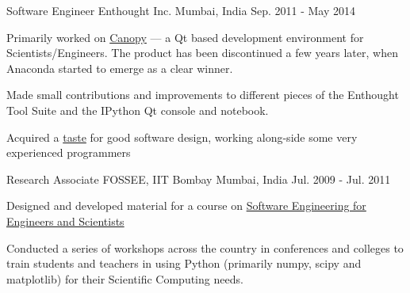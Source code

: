 \begin{cventries}
  \cventry
    {Software Engineer} %
    {Enthought Inc. } %
    {Mumbai, India} %
    {Sep. 2011 - May 2014} %
    {
      \begin{cvitems} %
        \item {Primarily worked on \href{https://web.archive.org/web/20170621202502/https://www.enthought.com/products/canopy/}{Canopy} --- a Qt based development environment for Scientists/Engineers. The product has been discontinued a few years later, when Anaconda started to emerge as a clear winner.}
        \item {Made small contributions and improvements to different pieces of the Enthought Tool Suite and the IPython Qt console and notebook.}
        \item {Acquired a \href{https://rawgit.com/punchagan/340e1350fdfc766c6599/raw/ca1f5fe9bfc1cc503cd8a524e350bd29e8f5f33d/month-with-martin.html}{taste} for good software design, working along-side some very experienced programmers}
      \end{cvitems}
    }

  \cventry
    {Research Associate} %
    {FOSSEE, IIT Bombay } %
    {Mumbai, India} %
    {Jul. 2009 - Jul. 2011} %
    {
      \begin{cvitems} %
        \item {Designed and developed material for a course on \href{https://github.com/FOSSEE/sees}{Software Engineering for Engineers and Scientists}}
        \item {Conducted a series of workshops across the country in conferences and colleges to train students and teachers in using Python (primarily numpy, scipy and matplotlib) for their Scientific Computing needs.}
      \end{cvitems}
    }

\end{cventries}
